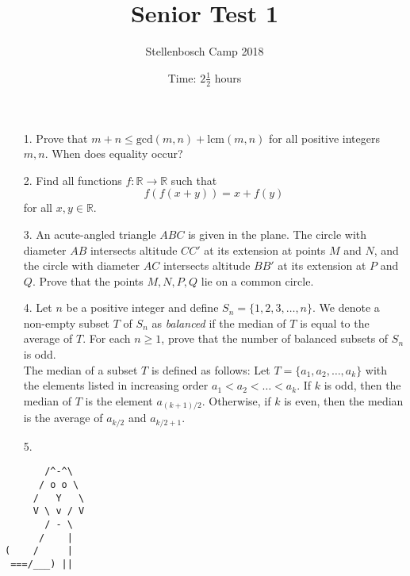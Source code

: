 \documentclass[a4paper, 12pt]{article}
\title{Senior Test 1}
\author{Stellenbosch Camp 2018}
\date{Time: $2 \frac{1}{2}$ hours}
\begin{document}
 \maketitle

\begin{enumerate}


\item[1.] Prove that $m + n \leq \textrm{gcd}(m, n) + \textrm{lcm}(m, n)$ for all positive integers $m, n$. When does equality occur?

\item[2.] Find all functions $f : \mathbb{R} \to \mathbb{R}$ such that
$$ f(f(x+y)) = x + f(y) $$
for all $x, y \in \mathbb{R}$.

\item[3.] An acute-angled triangle $ABC$ is given in the plane. The circle with diameter $AB$ intersects altitude $CC'$ at its extension at points $M$ and $N$, and the circle with diameter $AC$ intersects altitude $BB'$ at its extension at $P$ and $Q$. Prove that the points $M, N, P, Q$ lie on a common circle.


\item[4.] Let $n$ be a positive integer and define $S_n = \{1, 2, 3, \dots, n\}$. We denote a non-empty subset $T$ of $S_n$ as \textit{balanced} if the median of $T$ is equal to the average of $T$. For each $n \geq 1$, prove that the number of balanced subsets of $S_n$ is odd. \\


The median of a subset $T$ is defined as follows: Let $T = \{a_1, a_2, \dots, a_k\}$ with the elements listed in increasing order $a_1 < a_2 < \dots < a_k$. If $k$ is odd, then the median of $T$ is the element $a_{(k+1)/2}$. Otherwise, if $k$ is even, then the median is the average of $a_{k/2}$ and $a_{k/2 + 1}$.

\item[5.] 

\end{enumerate}

\vfill

\centering
\begin{BVerbatim}
       /^-^\
      / o o \
     /   Y   \
     V \ v / V
       / - \
      /    |
(    /     |
 ===/___) ||
\end{BVerbatim}
\end{document}
